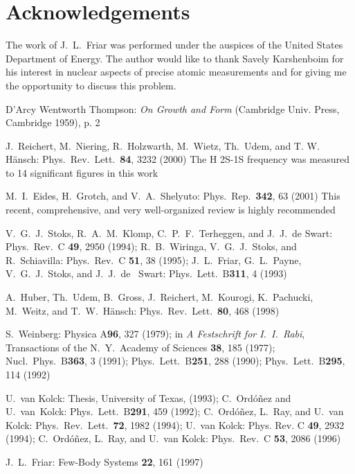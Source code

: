 \documentclass{svmult}
\begin{document}
\section{Acknowledgements}
The work of J.\ L.\ Friar was performed under the auspices of the United States
Department of Energy. The author would like to thank Savely Karshenboim for his
interest in nuclear aspects of precise atomic measurements and for giving me the
opportunity to discuss this problem.

\begin{thebibliography}{999}

 D'Arcy Wentworth Thompson: {\it On Growth and Form} (Cambridge
Univ. Press, Cambridge 1959), p. 2

 J.\ Reichert, M.\ Niering, R.\ Holzwarth, M.\ Wietz, Th.\ Udem, 
and T. W. H\"{a}nsch: Phys.\ Rev.\ Lett.\ {\bf 84}, 3232 (2000)  The H 2S-1S 
frequency was measured to 14 significant figures in this work

 M.\ I.\ Eides, H.\ Grotch, and V.\ A.\ Shelyuto:
Phys.\ Rep.\ {\bf 342}, 63 (2001)  This recent, comprehensive, and very 
well-organized review is highly recommended

 V.\ G.\ J.\ Stoks, R.\ A.\ M.\ Klomp,
C.\ P.\ F.\ Terheggen, and  J.\ J.\ de Swart: Phys.\ Rev.\ C {\bf 49}, 2950
(1994); R.\ B.\ Wiringa, V.\ G.\ J.\ Stoks, and R.\ Schiavilla: Phys.\ 
Rev.\ C {\bf 51}, 38 (1995); J.\ L.\ Friar, G.\ L.\ Payne, V.\ G.\ J.\ Stoks, 
and J.\ J.\ de~ Swart: Phys.\ Lett.\ B{\bf 311}, 4 (1993)

 A.\ Huber, Th.\ Udem, B.\ Gross, J.\ Reichert, M.\ Kourogi,
K.\ Pachucki, M.\ Weitz, and T.\ W.\ H\"{a}nsch: Phys.\ Rev.\ Lett.\ {\bf 80},
468 (1998)

 S.\ Weinberg: Physica A{\bf 96}, 327 (1979); in {\it A 
Festschrift for I.\ I.\ Rabi}, Transactions of the N.\ Y.\ Academy of Sciences 
{\bf 38}, 185 (1977); Nucl.\ Phys.\ B{\bf 363}, 3 (1991); Phys.\ Lett.\ 
B{\bf 251}, 288 (1990); Phys.\ Lett.\ B{\bf 295}, 114 (1992)

 U.\ van Kolck: Thesis, University of Texas, (1993); 
C.\ Ord\'o\~nez and U.\ van~Kolck: Phys.\ Lett.\ B{\bf 291}, 459 (1992); 
C.\ Ord\'o\~nez, L.\ Ray, and U.\ van Kolck: Phys.\ Rev.\ Lett.\ {\bf 72}, 
1982 (1994); U.\ van Kolck: Phys. Rev. C {\bf 49}, 2932 (1994); C.\ Ord\'o\~nez,
L.\ Ray, and U.\ van Kolck: Phys.\ Rev.\ C {\bf 53}, 2086 (1996)

\bibitem{pc} J.\ L.\ Friar: Few-Body Systems {\bf 22}, 161 (1997)


\end{thebibliography}
\end{document}
